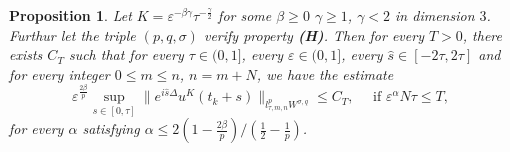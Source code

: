 \documentclass[10pt,a4paper]{article}
\newtheorem{proposition}[theorem]{Proposition}
\begin{document}
  \begin{proposition}\label{uKlpLq}
    Let \(K = \varepsilon^{-\beta\gamma}\tau^{-\frac\gamma2}\) for some
    \(\beta\geq0\) \(\gamma\geq1\), \(\gamma<2\) in dimension \(3\). Furthur let the
    triple \((p,q,\sigma)\) verify property {\bf (H)}.  Then for every \(T > 0\),
    there exists \(C_T\) such that for every \( \tau \in (0,1] \), every \(\varepsilon \in (0,1]\), 
    every \(\hat{s} \in [-2\tau,2\tau] \) and for every integer 
    \(0 \leq m \leq n \), \(n=m+N\), we have the estimate
    \begin{equation}
      \varepsilon^{\frac{2\beta}p} \sup_{s\in[0,\tau]} \|e^{i\hat{s}\Delta}u^K(t_k+s)\|_{l^p_{\tau,m,n}W^{\sigma,q}}
      \leq C_T,\quad \text{ if } \varepsilon^\alpha N\tau \leq T,
    \end{equation}
    for every \(\alpha\) satisfying \(\alpha \leq {2(1-\frac{2\beta}p)}/(\frac12-\frac1p)\).
  \end{proposition}
\end{document}
